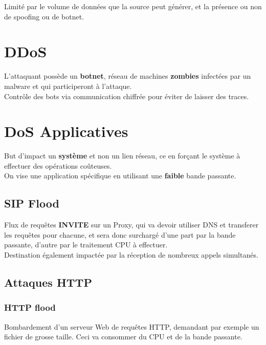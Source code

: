 \documentclass{report}
\begin{document}
			Limité par le volume de données que la source peut générer, et la présence ou non de spoofing ou de botnet.\\

	\section{DDoS}

		L'attaquant possède un \textbf{botnet}, réseau de machines \textbf{zombies} infectées par un malware et qui participeront à l'attaque.\\

		Contrôle des bots via communication chiffrée pour éviter de laisser des traces.\\

	\section{DoS Applicatives}

		But d'impact un \textbf{système} et non un lien réseau, ce en forçant le système à effectuer des opérations coûteuses.\\
		On vise une application spécifique en utilisant une \textbf{faible} bande passante.\\

		\subsection{SIP Flood}

			Flux de requêtes \textbf{INVITE} sur un Proxy, qui va devoir utiliser DNS et transferer les requêtes pour chacune, et sera donc surchargé d'une part par la bande passante, d'autre par le traitement CPU à effectuer.\\

			Destination également impactée par la réception de nombreux appels simultanés.\\

		\subsection{Attaques HTTP}

			\subsubsection{HTTP flood}

				Bombardement d'un serveur Web de requêtes HTTP, demandant par exemple un fichier de grosse taille. Ceci va consommer du CPU et de la bande passante.\\
\end{document}

